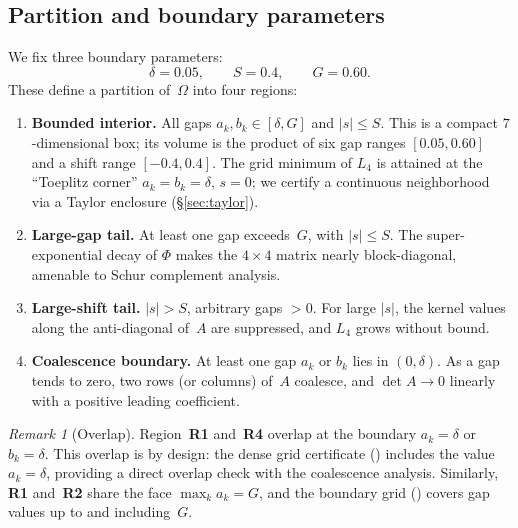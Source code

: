 \documentclass[11pt,a4paper]{amsart}
\theoremstyle{definition}
\theoremstyle{remark}
\newtheorem{remark}[theorem]{Remark}
\begin{document}
\subsection{Partition and boundary parameters}

We fix three boundary parameters:
\begin{equation}\label{eq:params}
  \delta = 0.05, \qquad S = 0.4, \qquad G = 0.60.
\end{equation}
These define a partition of~$\Omega$ into four regions:

\begin{enumerate}[label=\textbf{R\arabic*}., leftmargin=2em]
  \item \textbf{Bounded interior.}
        All gaps $a_k, b_k \in [\delta, G]$ and $|s| \le S$.
        This is a compact $7$-dimensional box; its volume is the
        product of six gap ranges $[0.05, 0.60]$ and
        a shift range $[-0.4, 0.4]$.
        The grid minimum of $L_4$ is attained at the ``Toeplitz corner''
        $a_k = b_k = \delta$, $s = 0$; we certify a continuous
        neighborhood via a Taylor enclosure (\S\ref{sec:taylor}).
  \item \textbf{Large-gap tail.}
        At least one gap exceeds~$G$, with $|s| \le S$.
        The super-exponential decay of $\Phi$ makes the $4\times 4$
        matrix nearly block-diagonal, amenable to Schur complement
        analysis.
  \item \textbf{Large-shift tail.}
        $|s| > S$, arbitrary gaps $> 0$.
        For large $|s|$, the kernel values along the anti-diagonal
        of~$A$ are suppressed, and $L_4$ grows without bound.
  \item \textbf{Coalescence boundary.}
        At least one gap $a_k$ or $b_k$ lies in $(0, \delta)$.
        As a gap tends to zero, two rows (or columns) of~$A$ coalesce,
        and $\det A \to 0$ linearly with a positive leading coefficient.
\end{enumerate}

\begin{remark}[Overlap]\label{rem:overlap}
Region~\textbf{R1} and~\textbf{R4} overlap at the boundary
$a_k = \delta$ or $b_k = \delta$.
This overlap is by design: the dense grid certificate
() includes the value $a_k = \delta$,
providing a direct overlap check with the coalescence analysis.
Similarly, \textbf{R1} and~\textbf{R2} share the face $\max_k a_k = G$,
and the boundary grid () covers gap values
up to and including~$G$.
\end{remark}
\end{document}
